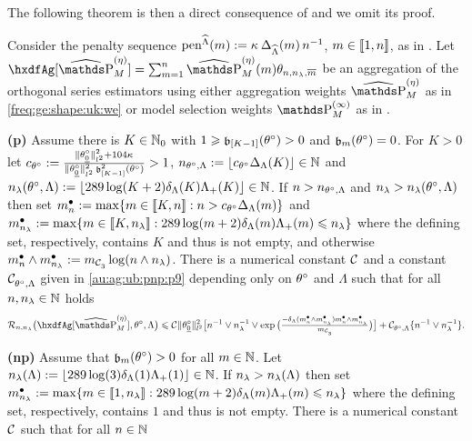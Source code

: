The following theorem is then a direct consequence of  and we omit its proof.
\begin{thm}
Consider the   penalty sequence $\peneSv:=\peneD$,
  $\Di\in\nset{1,\ssY}$, as in .
  Let $\hxdfAg[{\erWe[]}]=\sum_{\Di=1}^{\ssY} \erWe\hxdfPr$ be an aggregation of the orthogonal series estimators using either aggregation weights $\erWe[]$ as in \eqref{freq:ge:shape:uk:we} or model selection weights $\msWe[]$ as in .
  \begin{Liste}[]
  \item[{\dgrau\bfseries{(p)}}]Assume there is
    $K\in\Nz_0$ with $1\geq \bias[{[K-1] }](\xdf)>0$ and
    $\bias[\Di](\xdf)=0$. For $K>0$ let
    $c_{\xdf}:=\tfrac{\Vnormlp{\xdf_{\underline{0}}}^2+104\cpen}{\Vnormlp{\xdf_{\underline{0}}}^2\bias[{[K-1]}]^2(\xdf)}>1$,
    $\ssY_{\xdf,\Lambda}:=\floor{c_{\xdf}\DipenSv[K]}\in\Nz$ and
    $\ssE(\xdf,\Lambda):=\floor{289\log(K+2)\cmiSv[K]\miSv[K]}\in\Nz$. If
    $\ssY>\ssY_{\xdf,\Lambda}$ and $\ssE>\ssE(\xdf,\Lambda)$ then set
    $\sDi{\ssY}:=\max\{\Di\in\nset{K,\ssY}:\ssY>c_{\xdf}\DipenSv\}$
    and
    $\sDi{\ssE}:=\max\{\Di\in\nset{K,\ssE}:289\log(\Di+2)\cmiSv[\Di]\miSv[\Di]\leq\ssE\}$
    where the defining set, respectively, contains $K$ and thus is not
    empty, and otherwise $\sDi{\ssY}\wedge\sDi{\ssE}:=\Di_{\cst{3}}\log(\ssY\wedge\ssE)$.
    There is a numerical constant $\cst{}$ and a  constant $\cst{\xdf,\Lambda}$ given in
    \eqref{au:ag:ub:pnp:p9} depending only on $\xdf$ and $\Lambda$ such
    that for all $\ssY,\ssE\in\Nz$ holds
    \begin{equation}
       \nmRi{\hxdfAg[{\erWe[]}]}{\xdf,\Lambda}
       \leq
      \cst{}\Vnormlp{\xdf_{\underline{0}}}^2\big[\ssY^{-1}\vee \ssE^{-1} \vee
      \exp\big(\tfrac{-\cmiSv[\sDi{\ssY}\wedge\sDi{\ssE}]\sDi{\ssY}\wedge\sDi{\ssE}}{\Di_{\cst{3}}}\big)\big]\\
      + \cst{\xdf,\Lambda}\{\ssY^{-1}\vee\ssE^{-1}\}.
    \end{equation}
  \item[{\dgrau\bfseries{(np)}}] Assume that
    $\bias(\xdf)>0$ for all $\Di\in\Nz$. Let    
    $\ssE(\Lambda):=\floor{289\log(3)\cmiSv[1]\miSv[1]}\in\Nz$. If
    $\ssE>\ssE(\Lambda)$ then set
    $\sDi{\ssE}:=\max\{\Di\in\nset{1,\ssE}:289\log(\Di+2)\cmiSv[\Di]\miSv[\Di]\leq\ssE\}$
    where the defining set, respectively, contains $1$ and thus is not
    empty.  There is a numerical constant $\cst{}$  such that for all $\ssY\in\Nz$

\end{Liste}
\end{thm}
